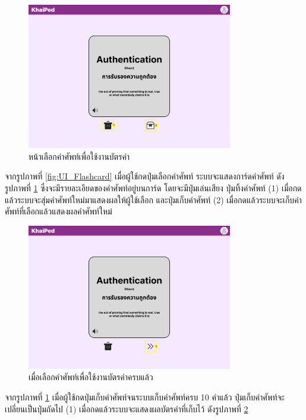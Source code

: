 \documentclass[12pt,oneside,openright,a4paper]{cpe-thai-project}
\begin{document}
\begin{figure}[!h]\centering
	\includegraphics[width=0.8\textwidth, keepaspectratio=true]{image/chap3/ui/flashcard/Flashcard - Select Word.png}
	\caption{หน้าเลือกคำศัพท์เพื่อใช้งานบัตรคำ}\label{fig:UI_SelectFlashcard1}
\end{figure}
\hspace{1cm}
จากรูปภาพที่ \ref{fig:UI_Flashcard} เมื่อผู้ใช้กดปุ่มเลือกคำศัพท์ ระบบจะแสดงการ์ดคำศัพท์ ดังรูปภาพที่ \ref{fig:UI_SelectFlashcard1} 
ซึ่งจะมีรายละเอียดของคำศัพท์อยู่บนการ์ด โดยจะมีปุ่มเล่นเสียง ปุ่มทิ้งคำศัพท์ (1)
เมื่อกดแล้วระบบจะสุ่มคำศัพท์ใหม่มาแสดงผลให้ผู้ใช้เลือก และปุ่มเก็บคำศัพท์ (2) เมื่อกดแล้วระบบจะเก็บคำศัพท์ที่เลือกแล้วแสดงผลคำศัพท์ใหม่

\pagebreak
\begin{figure}[!h]\centering
	\includegraphics[width=0.8\textwidth, keepaspectratio=true]{image/chap3/ui/flashcard/Flashcard - Select Word-1.png}
	\caption{เมื่อเลือกคำศัพท์เพื่อใช้งานบัตรคำครบแล้ว}\label{fig:UI_SelectFlashcard2}
\end{figure}
\hspace{1cm}
จากรูปภาพที่ \ref{fig:UI_SelectFlashcard1} เมื่อผู้ใช้กดปุ่มเก็บคำศัพท์จนระบบเก็บคำศัพท์ครบ 10 คำแล้ว 
ปุ่มเก็บคำศัพท์จะเปลี่ยนเป็นปุ่มถัดไป (1) เมื่อกดแล้วระบบจะแสดงผลบัตรคำที่เก็บไว้ ดังรูปภาพที่ \ref{fig:UI_SelectFlashcard2}
\end{document}
